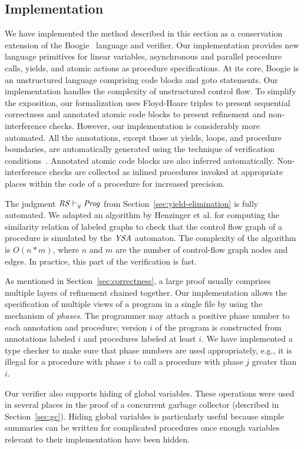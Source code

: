 \subsection{Implementation}
\label{sec:implementation}

We have implemented the method described in this section as a conservation extension 
of the Boogie~\cite{BarnettCDJL05} language and verifier.
Our implementation provides new language primitives for linear variables, asynchronous and parallel procedure calls, 
yields, and atomic actions as procedure specifications.
At its core, Boogie is an unstructured language comprising code blocks and goto statements.
Our implementation handles the complexity of unstructured control flow.
To simplify the exposition, our formalization uses Floyd-Hoare triples to present sequential correctness and 
annotated atomic code blocks to present refinement and non-interference checks.
However, our implementation is considerably more automated.  
All the annotations, except those at yields, loops, and procedure boundaries, are automatically generated 
using the technique of verification conditions~\cite{BL05}.
Annotated atomic code blocks are also inferred automatically.
Non-interference checks are collected as inlined procedures
invoked at appropriate places within the code of a procedure for increased precision.

The judgment $\mathit{RS} \vdash_y \mathit{Prog}$ from Section~\ref{sec:yield-elimination} is fully automated.
We adapted an algorithm by Henzinger et al.\cite{HenzingerHK95} for computing the similarity relation of 
labeled graphs to check that the control flow graph of a procedure is simulated by
the $\mathit{YSA}$ automaton.
The complexity of the algorithm is $O(n*m)$, where $n$ and $m$ are the number of control-flow graph nodes and edges.
In practice, this part of the verification is fast.

As mentioned in Section~\ref{sec:correctness}, a large proof usually comprises multiple layers of refinement chained together.
Our implementation allows the specification of multiple views of a program in a single file by using the mechanism of {\em phases}.
The programmer may attach a positive phase number to each annotation and procedure; 
version $i$ of the program is constructed from annotations labeled $i$ and procedures labeled at least $i$.
We have implemented a type checker to make sure that phase numbers are used appropriately, e.g., 
it is illegal for a procedure with phase $i$ to call a procedure with phase $j$ greater than $i$.

Our verifier also supports hiding of global variables.
These operations were used in several places in the proof of a concurrent garbage collector (described in Section~\ref{sec:gc}).
Hiding global variables is particularly useful because simple summaries can be written for complicated procedures
once enough variables relevant to their implementation have been hidden.
